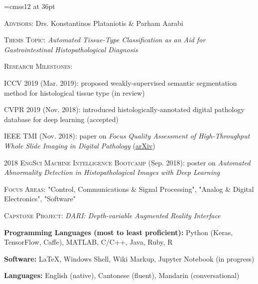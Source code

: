 \documentclass[12pt]{cv_style}
\begin{document}
\font\titlefont=cmss12 at 36pt


\flushleft{}
\begin{ditem}
	\item \textsc{Advisors:} Drs. Konstantinos Plataniotis \& Parham Aarabi
	\item \textsc{Thesis Topic:} \textit{Automated Tissue-Type Classification as an Aid for Gastrointestinal Histopathological Diagnosis}
	\item \textsc{Research Milestones:}
	\begin{ditem}
		\item \textsc{ICCV 2019} (Mar. 2019): proposed weakly-supervised semantic segmentation method for histological tissue type (in review)
		\item \textsc{CVPR 2019} (Nov. 2018): introduced histologically-annotated digital pathology database for deep learning (accepted)
		\item \textsc{IEEE TMI} (Nov. 2018): paper on \emph{Focus Quality Assessment of High-Throughput Whole Slide Imaging in Digital Pathology} (\href{https://arxiv.org/abs/1811.06038}{arXiv})
		\item \textsc{2018 EngSci Machine Intelligence Bootcamp} (Sep. 2018): poster on \emph{Automated Abnormality Detection in Histopathological Images with Deep Learning}
	\end{ditem}
\end{ditem}
\medspace
{}
\begin{ditem}
	\item \textsc{Focus Areas:} "Control, Communications \& Signal Processing", "Analog \& Digital Electronics", "Software"
	\item \textsc{Capstone Project:} \textit{DARI: Depth-variable Augmented Reality Interface}	
\end{ditem}

\begin{ditem}
	\item \textbf{Programming Languages (most to least proficient):} Python (Keras, TensorFlow, Caffe), MATLAB, C/C++, Java, Ruby, R
	\item \textbf{Software:} \LaTeX, Windows Shell, Wiki Markup, Jupyter Notebook (in progress)
	\item \textbf{Languages:} English (native), Cantonese (fluent), Mandarin (conversational)
\end{ditem}
\end{document}
